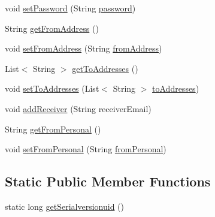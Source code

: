 \begin{DoxyCompactItemize}
\item 
void \hyperlink{classbr_1_1usp_1_1cata_1_1model_1_1_email_a40e29ef105afce73be931551aad9e4e9}{set\+Password} (String \hyperlink{classbr_1_1usp_1_1cata_1_1model_1_1_email_a33ee916dcfa41c830317e93ce3a68c3e}{password})
\item 
String \hyperlink{classbr_1_1usp_1_1cata_1_1model_1_1_email_af735e098c249e0364c03bcf6584f8d98}{get\+From\+Address} ()
\item 
void \hyperlink{classbr_1_1usp_1_1cata_1_1model_1_1_email_a9b90e9222e0fc583b0493e61c59c240c}{set\+From\+Address} (String \hyperlink{classbr_1_1usp_1_1cata_1_1model_1_1_email_ac14d376423021153643da3fb9fb71153}{from\+Address})
\item 
List$<$ String $>$ \hyperlink{classbr_1_1usp_1_1cata_1_1model_1_1_email_a5e4f38358fe4f6dbef4fb3ed1a30d3ab}{get\+To\+Addresses} ()
\item 
void \hyperlink{classbr_1_1usp_1_1cata_1_1model_1_1_email_abc2b17856a23637714ce1268ab0243b5}{set\+To\+Addresses} (List$<$ String $>$ \hyperlink{classbr_1_1usp_1_1cata_1_1model_1_1_email_aa2dd2e6b3172d41d0b4af46e07687e0d}{to\+Addresses})
\item 
void \hyperlink{classbr_1_1usp_1_1cata_1_1model_1_1_email_a51e856c27bc79d9df5d4d7102dfc58f9}{add\+Receiver} (String receiver\+Email)
\item 
String \hyperlink{classbr_1_1usp_1_1cata_1_1model_1_1_email_a389a572a5b3d3fcad4622f166b452b8f}{get\+From\+Personal} ()
\item 
void \hyperlink{classbr_1_1usp_1_1cata_1_1model_1_1_email_ab83cf7c8de3ed1b22a52cca74a48fa7e}{set\+From\+Personal} (String \hyperlink{classbr_1_1usp_1_1cata_1_1model_1_1_email_a1b531f2c52d506121d3b17e04aeebca7}{from\+Personal})
\end{DoxyCompactItemize}
\subsection*{Static Public Member Functions}
\begin{DoxyCompactItemize}
\item 
static long \hyperlink{classbr_1_1usp_1_1cata_1_1model_1_1_email_a1cabf35afd6afbc08b86f4efeed8ccfb}{get\+Serialversionuid} ()
\end{DoxyCompactItemize}
